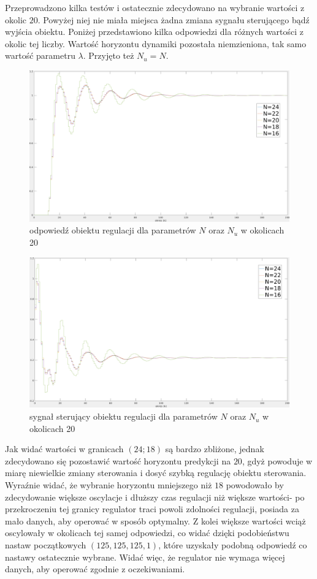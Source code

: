 \documentclass[fleqn]{article}
\begin{document}
Przeprowadzono kilka testów i ostatecznie zdecydowano na wybranie wartości z okolic $20$. Powyżej niej nie miała miejsca żadna zmiana sygnału sterującego bądź wyjścia obiektu. Poniżej przedstawiono kilka odpowiedzi dla różnych wartości z okolic tej liczby. Wartość horyzontu dynamiki pozostała niemzieniona, tak samo wartość parametru $\lambda$. Przyjęto też $N_u=N$.

\begin{figure}[H]
	\includegraphics[width=\textwidth]{scripts/zadanie5bwyjscie2.png}
	\caption{odpowiedź obiektu regulacji dla parametrów $N$ oraz $N_u$ w okolicach 20}
\end{figure}
\begin{figure}[H]
	\includegraphics[width=\textwidth]{scripts/zadanie5bster2.png}
	\caption{sygnał sterujący obiektu regulacji dla parametrów $N$ oraz $N_u$ w okolicach 20}
\end{figure}

Jak widać wartości w granicach $(24;18)$ są bardzo zbliżone, jednak zdecydowano się pozostawić wartość horyzontu predykcji na $20$, gdyż powoduje w miarę niewielkie zmiany sterowania i dosyć szybką regulację obiektu sterowania. Wyraźnie widać, że wybranie horyzontu mniejszego niż $18$ powodowało by zdecydowanie większe oscylacje i dłuższy czas regulacji niż większe wartości- po przekroczeniu tej granicy regulator traci powoli zdolności regulacji, posiada za mało danych, aby operować w sposób optymalny. Z kolei większe wartości wciąż oscylowały w okolicach tej samej odpowiedzi, co widać dzięki podobieństwu nastaw początkowych $(125, 125, 125, 1)$, które uzyskały podobną odpowiedź co nastawy ostatecznie wybrane. Widać więc, że regulator nie wymaga więcej danych, aby operować zgodnie z oczekiwaniami.
\end{document}
